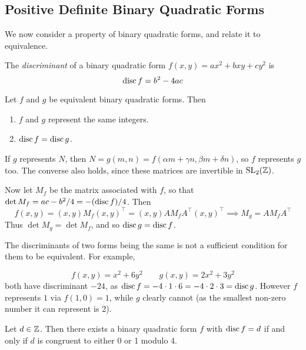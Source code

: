 \documentclass{article}
\begin{document}

\subsection{Positive Definite Binary Quadratic Forms}
\label{subsection-quadratic-forms-pdbqfs}

We now consider a property of binary quadratic forms, and relate it to equivalence.

\begin{definition}[Discriminant]
    The \textit{discriminant} of a binary quadratic form $f(x, y) = ax^2 + bxy + cy^2$ is
    \[
	\operatorname{disc} f = b^2 - 4ac
	\]
\end{definition}

\begin{proposition}
	\label{equivalence-of-forms}
    Let $f$ and $g$ be equivalent binary quadratic forms. Then
    \begin{enumerate}
    	\item $f$ and $g$ represent the same integers.
    	\item $\operatorname{disc} f = \operatorname{disc} g$.
	\end{enumerate}
\end{proposition}

\begin{prf}
    If $g$ represents $N$, then $N = g(m, n) = f(\alpha m + \gamma n, \beta m + \delta n)$, so $f$ represents $g$ too. The converse also holds, since these matrices are invertible in $\mathrm{SL}_2(\mathbb{Z})$.
    
    Now let $M_f$ be the matrix associated with $f$, so that $\det M_f = ac - b^2/4 = -(\operatorname{disc} f) / 4$. Then
    \[
	f(x, y) = (x, y) M_f (x, y)^\top = (x, y)A M_f A^\top (x, y)^\top \implies M_g = A M_f A^\top
	\]
	Thus $\det M_g = \det M_f$, and so $\operatorname{disc} g = \operatorname{disc} f$.
\end{prf}

\begin{note}
	The discriminants of two forms being the same is not a sufficient condition for them to be equivalent. For example,
\end{note}
\[
f(x, y) = x^2 + 6y^2 \qquad g(x, y) = 2x^2 + 3 y^2
\]
both have discriminant $-24$, as $\operatorname{disc} f = -4 \cdot 1 \cdot 6 = -4 \cdot 2 \cdot 3 = \operatorname{disc} g$. However $f$ represents $1$ via $f(1, 0) = 1$, while $g$ clearly cannot (as the smallest non-zero number it can represent is 2).

\begin{proposition}
    Let $d \in \mathbb{Z}$. Then there exists a binary quadratic form $f$ with $\operatorname{disc} f = d$ if and only if $d$ is congruent to either 0 or 1 modulo 4.
\end{proposition}
\end{document}
